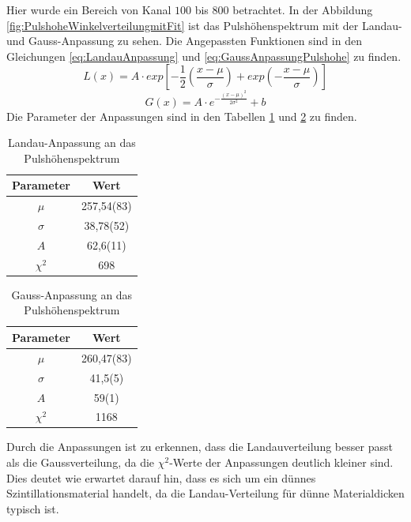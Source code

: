 \documentclass{article}
\begin{document}
Hier wurde ein Bereich von Kanal $100$ bis $800$ betrachtet.
In der Abbildung \ref{fig:PulshoheWinkelverteilungmitFit} ist das Pulshöhenspektrum mit der Landau- und Gauss-Anpassung zu sehen.
Die Angepassten Funktionen sind in den Gleichungen \ref{eq:LandauAnpassung} und \ref{eq:GaussAnpassungPulshohe} zu finden.
\begin{equation}
    L(x) = A \cdot exp\left[ -\frac{1}{2} \left( \frac{x - \mu}{\sigma} \right) + exp\left( -\frac{x - \mu }{\sigma} \right) \right] 
\label{eq:LandauAnpassung}
\end{equation}
\begin{equation}
    G(x) = A \cdot e^{-\frac{(x - \mu)^2}{2\sigma^2}} + b
\label{eq:GaussAnpassungPulshohe}
\end{equation}
Die Parameter der Anpassungen sind in den Tabellen \ref{tab:LandauAnpassungPulshohe} und \ref{tab:GaussAnpassungPulshohe} zu finden.
\begin{table}[H]
    \centering
    \caption{Landau-Anpassung an das Pulshöhenspektrum}
    \begin{tabular}{|c|c|}
        \hline
        Parameter & Wert \\ \hline \hline
        $\mu$ & 257,54(83) \\ \hline
        $\sigma$ & 38,78(52) \\ \hline
        $A$ & 62,6(11) \\ \hline
        $\chi^2$ & 698 \\ \hline
    \end{tabular}
    \label{tab:LandauAnpassungPulshohe}
\end{table}
\begin{table}[H]
    \centering
    \caption{Gauss-Anpassung an das Pulshöhenspektrum}
    \begin{tabular}{|c|c|}
        \hline
        Parameter & Wert \\ \hline \hline
        $\mu$ & 260,47(83) \\ \hline
        $\sigma$ & 41,5(5) \\ \hline
        $A$ & 59(1) \\ \hline
        $\chi^2$ & 1168 \\ \hline
    \end{tabular}
    \label{tab:GaussAnpassungPulshohe}
\end{table}

Durch die Anpassungen ist zu erkennen, dass die Landauverteilung besser passt als die Gaussverteilung, da die $\chi^2$-Werte der Anpassungen deutlich kleiner sind.
Dies deutet wie erwartet darauf hin, dass es sich um ein dünnes Szintillationsmaterial handelt, da die Landau-Verteilung für dünne Materialdicken typisch ist.
\end{document}
